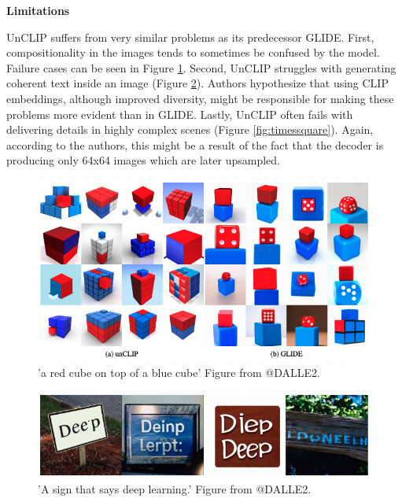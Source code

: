 \documentclass[
]{krantz}
\begin{document}
\textbf{Limitations}

UnCLIP suffers from very similar problems as its predecessor GLIDE. First, compositionality in the images tends to sometimes be confused by the model. Failure cases can be seen in Figure \ref{fig:cube}. Second, UnCLIP struggles with generating coherent text inside an image (Figure \ref{fig:sign}). Authors hypothesize that using CLIP embeddings, although improved diversity, might be responsible for making these problems more evident than in GLIDE. Lastly, UnCLIP often fails with delivering details in highly complex scenes (Figure \ref{fig:timessquare}). Again, according to the authors, this might be a result of the fact that the decoder is producing only 64x64 images which are later upsampled.

\begin{figure}

{\centering \includegraphics[width=1\linewidth]{figures/02-02-text-2-img/cube} 

}

\caption{'a red cube on top of a blue cube' Figure from @DALLE2.}\label{fig:cube}
\end{figure}

\begin{figure}

{\centering \includegraphics[width=1\linewidth]{figures/02-02-text-2-img/sign} 

}

\caption{'A sign that says deep learning.' Figure from @DALLE2.}\label{fig:sign}
\end{figure}
\end{document}
